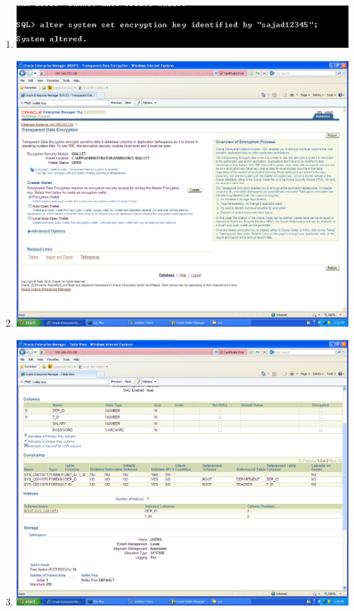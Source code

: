 \documentclass{article}
\begin{document}
\begin{enumerate}
	\item
		\includegraphics[scale=0.4]{figs/8.jpg}
	\item
		\includegraphics[scale=0.4]{figs/9.jpg}
	\item
		\includegraphics[scale=0.4]{figs/10.jpg}

\end{enumerate}
\end{document}
